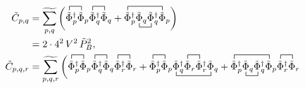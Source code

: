 \begin{align}\label{eq:CEP_firstOrder_twoLoop_withDetAndLambda_6}
 \tilde C_{p,q} & = \widetilde{\sum\limits_{p,q}} \left( 
                     \contraction{}{\tilde\Phi}{{}_{p}^{\dagger}}{\tilde\Phi}
                     \contraction{\tilde\Phi_{p}^{\dagger} \tilde\Phi_{p}}{\tilde\Phi}{{}_{q}^{\dagger}}{\tilde\Phi}
                     \tilde\Phi_{p}^{\dagger} \tilde\Phi_{p} \tilde\Phi_{q}^{\dagger} \tilde\Phi_{q} 
                   + \contraction{}{\tilde\Phi}{^{\dagger} \tilde\Phi_{q} \tilde\Phi_{q}^{\dagger} }{\tilde\Phi}
                     \bcontraction{\tilde\Phi_{p}^{\dagger}}{\tilde\Phi}{{}_{q}}{\tilde\Phi}
                     \tilde\Phi_{p}^{\dagger} \tilde\Phi_{q} \tilde\Phi_{q}^{\dagger} \tilde\Phi_{p}
                     \right) 
        \nonumber \\
                & = 2\cdot4^2\, V^2\, \tilde P_B^2,
        \\\label{eq:CEP_firstOrder_threeLoop_withDetAndLambda_6}
 \tilde C_{p,q,r} & = \widetilde{\sum\limits_{p,q,r}} \left( 
                     \contraction{}{ \tilde\Phi}{{}_{p}^{\dagger} }{\tilde\Phi}
                     \contraction{\tilde\Phi_{p}^{\dagger} \tilde\Phi_{p}}{ \tilde\Phi}{{}_{q}^{\dagger} }{\tilde\Phi}
                     \contraction{\tilde\Phi_{p}^{\dagger} \tilde\Phi_{p}\tilde\Phi_{q}^{\dagger} \tilde\Phi_{q}}{ \tilde\Phi}{{}_{r}^{\dagger} }{\tilde\Phi}
                     \tilde\Phi_{p}^{\dagger} \tilde\Phi_{p} \tilde\Phi_{q}^{\dagger} \tilde\Phi_{q} \tilde\Phi_{r}^{\dagger} \tilde\Phi_{r} 
                   + \contraction{}{ \tilde\Phi}{ {}_{p}^{\dagger} }{ \tilde\Phi }
                     \bcontraction{ \tilde\Phi_{p}^{\dagger} \tilde\Phi_{p} }{ \tilde\Phi }{ {}^{\dagger} \tilde\Phi_{r} \tilde\Phi_{r}^{\dagger} }{\tilde\Phi }
                     \contraction{ \tilde\Phi_{p}^{\dagger} \tilde\Phi_{p} \tilde\Phi_{q}^{\dagger} }{ \tilde\Phi }{ {}_{r} }{ \tilde \Phi }
                     \tilde\Phi_{p}^{\dagger} \tilde\Phi_{p} \tilde\Phi_{q}^{\dagger} \tilde\Phi_{r} \tilde\Phi_{r}^{\dagger} \tilde\Phi_{q} 
                   + \contraction{}{ \tilde\Phi }{ {}_{p}^{\dagger} \tilde\Phi_{q} \tilde\Phi_{q}^{\dagger} }{\tilde\Phi}
                     \bcontraction{ \tilde\Phi_{p}^{\dagger} }{ \tilde\Phi }{ {}_{q} }{\tilde \Phi}
                     \contraction{ \tilde\Phi_{p}^{\dagger} \tilde\Phi_{q} \tilde\Phi_{q}^{\dagger} \tilde\Phi_{p} }{ \tilde\Phi }{ {}_{r}^{\dagger} }{ \tilde\Phi }
                     \tilde\Phi_{p}^{\dagger} \tilde\Phi_{q} \tilde\Phi_{q}^{\dagger} \tilde\Phi_{p} \tilde\Phi_{r}^{\dagger} \tilde\Phi_{r} \right.

\end{align}
